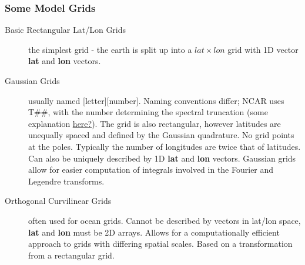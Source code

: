 \documentclass{article}
\begin{document}
\subsubsection{Some Model Grids}
\begin{description}
\item [Basic Rectangular Lat/Lon Grids] the simplest grid - the earth is split up into a $lat\times lon$ grid with 1D vector \textbf{lat} and \textbf{lon} vectors. 
\item [Gaussian Grids] usually named [letter][number]. Naming conventions differ; NCAR uses T\#\#, with the number determining the spectral truncation (some explanation  \href{https://software.ecmwf.int/wiki/display/FCST/Relationship+between+spectral+truncation+and+grid+point+resolution}{\underline{here?}}). The grid is also rectangular, however latitudes are unequally spaced and defined by the Gaussian quadrature. No grid points at the poles. Typically the number of longitudes are twice that of latitudes. Can also be uniquely described by 1D \textbf{lat} and \textbf{lon} vectors. Gaussian grids allow for easier computation of integrals involved in the Fourier and Legendre transforms. 
\item [Orthogonal Curvilinear Grids] often used for ocean grids. Cannot be described by vectors in lat/lon space, \textbf{lat} and \textbf{lon} must be 2D arrays. Allows for a computationally efficient approach to grids with differing spatial scales. Based on a transformation from a rectangular grid. 
\end{description}
\end{document}
